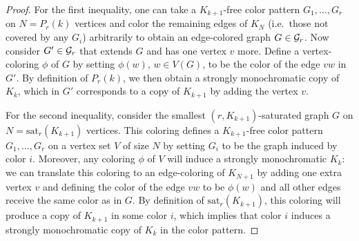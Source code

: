 \documentclass[12pt]{article}
\newcommand{\cG}{{\cal G}}
\theoremstyle{definition}
\begin{document}
	\begin{proof}
		For the first inequality, one can take a $K_{k+1}$-free color pattern $G_1,\dots,G_r$ on $N = P_r(k)$ vertices and color the remaining edges of $K_N$ (i.e.\ those not covered by any $G_i$) arbitrarily to obtain an edge-colored graph $G \in \cG_r$. Now consider $G' \in \cG_r$ that extends $G$ and has one vertex $v$ more. Define a vertex-coloring $\phi$ of $G$ by setting $\phi(w)$, $w \in V(G)$, to be the color of the edge $vw$ in $G'$. By definition of $P_r(k)$, we then obtain a strongly monochromatic copy of $K_k$, which in $G'$ corresponds to a copy of $K_{k+1}$ by adding the vertex $v$. 
		
		For the second inequality, consider the smallest $(r,K_{k+1})$-saturated graph $G$ on $N = \mathrm{sat}_r(K_{k+1})$ vertices. This coloring defines a $K_{k+1}$-free color pattern $G_1,\dots,G_r$ on a vertex set $V$ of size $N$ by setting $G_i$ to be the graph induced by color $i$. Moreover, any coloring $\phi$ of $V$ will induce a strongly monochromatic $K_k$: we can translate this coloring to an edge-coloring of $K_{N+1}$ by adding one extra vertex $v$ and defining the color of the edge $vw$ to be $\phi(w)$ and all other edges receive the same color as in $G$. By definition of $\mathrm{sat}_r(K_{k+1})$, this coloring will produce a copy of $K_{k+1}$ in some color $i$, which implies that color $i$ induces a strongly monochromatic copy of $K_k$ in the color pattern.
	\end{proof}
	\fi
\end{document}

